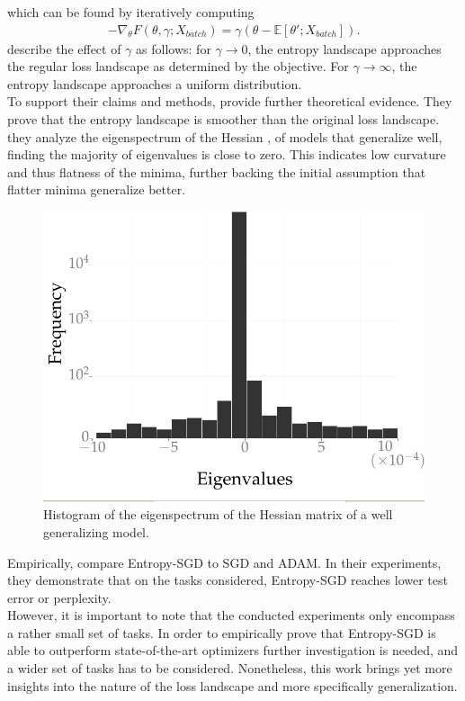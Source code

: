 \documentclass[a4paper]{scrartcl}
\begin{document}
which can be found by iteratively computing 
\begin{align}
	-\nabla_{\theta}F(\theta, \gamma; X_{batch}) = \gamma (\theta - \mathbb{E}\left[ \theta'; X_{batch} \right]).
\end{align}
\citet{chaudhari2019entropy} describe the effect of $\gamma$ as follows: for $\gamma \rightarrow 0$, the entropy landscape approaches the regular loss landscape as determined by the objective. For $\gamma \rightarrow \infty$, the entropy landscape approaches a uniform distribution.\\
To support their claims and methods, \citet{chaudhari2019entropy} provide further theoretical evidence. They prove that the entropy landscape is smoother than the original loss landscape. they analyze the eigenspectrum of the Hessian \cite{bishop1992exact}, of models that generalize well, finding the majority of eigenvalues is close to zero. This indicates low curvature and thus flatness of the minima, further backing the initial assumption that flatter minima generalize better.\\
\begin{figure}[H]
	\centering
	\includegraphics[width=.5\linewidth]{figures/eigenspectrum.png}
	\caption{Histogram of the eigenspectrum of the Hessian matrix of a well generalizing model.}
	\label{fig:eigenspectrum}
\end{figure}
Empirically, \citet{chaudhari2019entropy} compare Entropy-SGD to SGD and ADAM. In their experiments, they demonstrate that on the tasks considered, Entropy-SGD reaches lower test error or perplexity.\\
However, it is important to note that the conducted experiments only encompass a rather small set of tasks. In order to empirically prove that Entropy-SGD is able to outperform state-of-the-art optimizers further investigation is needed, and a wider set of tasks has to be considered. Nonetheless, this work brings yet more insights into the nature of the loss landscape and more specifically generalization.
\end{document}
